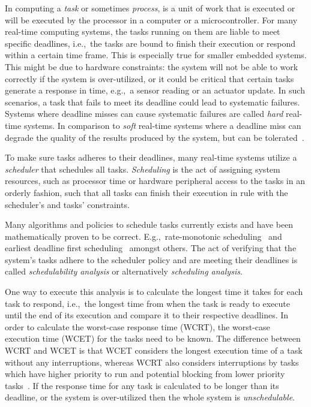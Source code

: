 In computing a \emph{task} or sometimes \emph{process}, is a unit of work that
is executed or will be executed by the processor in a computer or a
microcontroller.  For many real-time computing systems, the tasks running on
them are liable to meet specific deadlines, i.e.,\ the tasks are bound to finish
their execution or respond within a certain time frame. This is especially true
for smaller embedded systems. This might be due to hardware constraints: the
system will not be able to work correctly if the system is over-utilized, or it
could be critical that certain tasks generate a response in time, e.g.,\ a
sensor reading or an actuator update. In such scenarios, a task that fails to
meet its deadline could lead to systematic failures. Systems where deadline
misses can cause systematic failures are called \emph{hard} real-time systems.
In comparison to \emph{soft} real-time systems where a deadline miss can
degrade the quality of the results produced by the system, but can be
tolerated~\cite{hardrealtimecomputingsystems}.

To make sure tasks adheres to their deadlines, many real-time systems utilize
a \emph{scheduler} that schedules all tasks. \emph{Scheduling} is the act of
assigning system resources, such as processor time or hardware peripheral
access to the tasks in an orderly fashion, such that all tasks can finish their
execution in rule with the scheduler's and tasks' constraints.

Many algorithms and policies to schedule tasks currently exists and have been
mathematically proven to be correct.  E.g.,\ rate-monotonic
scheduling~\cite{ratemonotonic} and earliest deadline first scheduling~\cite{edf}
amongst others.  The act of verifying that the system's tasks adhere to the
scheduler policy and are meeting their deadlines is called \emph{schedulability
analysis} or alternatively \emph{scheduling analysis}.

One way to execute this analysis is to calculate the longest time it takes for
each task to respond, i.e.,\ the longest time from when the task is ready to
execute until the end of its execution and compare it to their respective
deadlines.  In order to calculate the worst-case response time (WCRT), the
worst-case execution time (WCET) for the tasks need to be known. The
difference between WCRT and WCET is that WCET considers the longest execution
time of a task without any interruptions, whereas WCRT also considers
interruptions by tasks which have higher priority to
run and potential blocking from lower priority
tasks~\cite{hardrealtimecomputingsystems}. If the response time for any task is
calculated to be longer than its deadline, or the system is over-utilized then
the whole system is \emph{unschedulable}.

